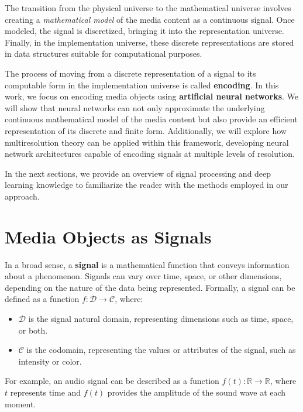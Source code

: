 The transition from the physical universe to the mathematical universe involves creating a \textit{mathematical model} of the media content as a continuous signal. Once modeled, the signal is discretized, bringing it into the representation universe. Finally, in the implementation universe, these discrete representations are stored in data structures suitable for computational purposes.

The process of moving from a discrete representation of a signal to its computable form in the implementation universe is called \textbf{encoding}. In this work, we focus on encoding media objects using \textbf{artificial neural networks}. We will show that neural networks can not only approximate the underlying continuous mathematical model of the media content but also provide an efficient representation of its discrete and finite form. Additionally, we will explore how multiresolution theory can be applied within this framework, developing neural network architectures capable of encoding signals at multiple levels of resolution.

In the next sections, we provide an overview of signal processing and deep learning knowledge to familiarize the reader  with the methods employed in our approach.


\section{Media Objects as Signals}

In a broad sense, a \textbf{signal} is a mathematical function that conveys information about a phenomenon. Signals can vary over time, space, or other dimensions, depending on the nature of the data being represented. Formally, a signal can be defined as a function \( f: \mathcal{D} \to \mathcal{C} \), where:

\begin{itemize}
  \item \( \mathcal{D} \) is the signal natural domain, representing dimensions such as time, space, or both.
  \item \( \mathcal{C} \) is the codomain, representing the values or attributes of the signal, such as intensity or color.
\end{itemize}

For example, an audio signal can be described as a function \( f(t): \mathbb{R} \to \mathbb{R} \), where \( t \) represents time and \( f(t) \) provides the amplitude of the sound wave at each moment. 

